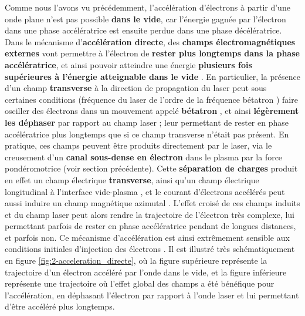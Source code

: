 \begin{refsection}
Comme nous l'avons vu précédemment, l'accélération d'électrons à partir d'une onde plane n'est pas possible \textbf{dans le vide}, car l'énergie gagnée par l'électron dans une phase accélératrice est ensuite perdue dans une phase décélératrice. 
Dans le mécanisme d'\textbf{accélération directe}, des \textbf{champs électromagnétiques externes} vont permettre à l'électron de \textbf{rester plus longtemps dans la phase accélératrice}, et ainsi pouvoir atteindre une énergie \textbf{plusieurs fois supérieures à l'énergie atteignable dans le vide} \parencite{arefiev_2016, jirka_2020, krygier_2014}.
En particulier, la présence d'un champ \textbf{transverse} à la direction de propagation du laser peut sous certaines conditions (fréquence du laser de l'ordre de la fréquence bétatron \parencite{corde_2013a}) faire osciller des électrons dans un mouvement appelé \textbf{bétatron} \parencite{pukhov_1999}, et ainsi \textbf{légèrement les déphaser} par rapport au champ laser ; leur permettant de rester en phase accélératrice plus longtemps que si ce champ transverse n'était pas présent.
En pratique, ces champs peuvent être produits directement par le laser, via le creusement d'un \textbf{canal sous-dense en électron} dans le plasma par la force pondéromotrice (voir section précédente). 
Cette \textbf{séparation de charges} produit en effet un champ électrique \textbf{transverse}, ainsi qu'un champ électrique longitudinal à l'interface vide-plasma \parencite{arefiev_2016}, et le courant d'électrons accélérés peut aussi induire un champ magnétique azimutal \parencite{jirka_2020, arefiev_2016}. L'effet croisé de ces champs induits et du champ laser peut alors rendre la trajectoire de l'électron très complexe, lui permettant parfois de rester en phase accélératrice pendant de longues distances, et parfois non.
Ce mécanisme d'accélération est ainsi extrêmement sensible aux conditions initiales d'injection des électrons \parencite{arefiev_2016, krygier_2014}.
Il est illustré très schématiquement en figure \ref{fig:2-acceleration_directe}, où la figure supérieure représente la trajectoire d'un électron accéléré par l'onde dans le vide, et la figure inférieure représente une trajectoire où l'effet global des champs a été bénéfique pour l'accélération, en déphasant l'électron par rapport à l'onde laser et lui permettant d'être accéléré plus longtemps.


\end{refsection}
